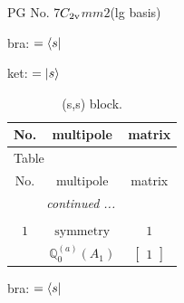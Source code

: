 \documentclass[fleqn,8pt,landscape]{jsarticle}
\begin{document}
\setcounter{MaxMatrixCols}{32}

\renewcommand{\tablename}{Table~}
\renewcommand{\figurename}{Figure~}
\begin{center}
\LARGE
PG No. 7\quad$C_{\rm 2v}$\quad$mm2$\quad[ orthorhombic ] (lg basis)
\end{center}
bra: $=\bra{s}$

\noindent
ket: $=\ket{s}$
\renewcommand{\arraystretch}{1.6}
\begin{longtable}{ccc}
\caption{(s,s) block.}
 \\
 \hline \hline
No. & multipole & matrix \\ \hline \endfirsthead

\multicolumn{2}{l}{\tablename\ \thetable{}} \\
 \hline \hline
No. & multipole & matrix \\ \hline \endhead

 \hline \hline
\multicolumn{2}{r}{\footnotesize\it continued ...} \\ \endfoot

 \hline \hline
\multicolumn{2}{r}{} \\ \endlastfoot

$ 1 $ & $ \text{symmetry} $ & $ 1 $ \\
$  $ & $ \mathbb{Q}_{0}^{(a)}(A_{1}) $ & $ \begin{bmatrix} 1 \end{bmatrix} $ \\ \hline
\end{longtable}
bra: $=\bra{s}$
\end{document}
